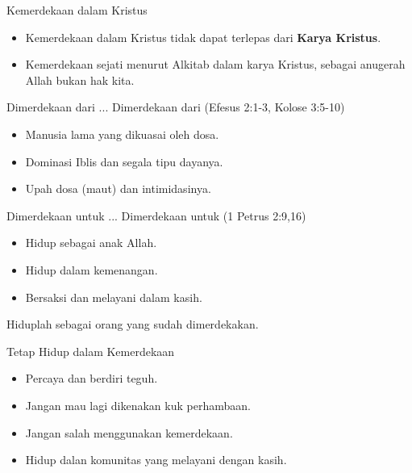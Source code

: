 \documentclass[10pt,svgnames]{beamer} %
\begin{document}
\begin{frame}{Kemerdekaan dalam Kristus}
	\begin{itemize}
		\item Kemerdekaan dalam Kristus tidak dapat terlepas dari \textbf{Karya Kristus}.
		\item Kemerdekaan sejati menurut Alkitab dalam karya Kristus, sebagai anugerah Allah bukan hak kita.
	\end{itemize}
\end{frame}

\begin{frame}{Dimerdekaan dari ...}
	Dimerdekaan dari (Efesus 2:1-3, Kolose 3:5-10)
	\begin{itemize}
		\item Manusia lama yang dikuasai oleh dosa.
		\item Dominasi Iblis dan segala tipu dayanya.
		\item Upah dosa (maut) dan intimidasinya.
	\end{itemize}
\end{frame}

\begin{frame}{Dimerdekaan untuk ...}
	Dimerdekaan untuk (1 Petrus 2:9,16)
	\begin{itemize}
		\item Hidup sebagai anak Allah.
		\item Hidup dalam kemenangan.
		\item Bersaksi dan melayani dalam kasih.
	\end{itemize}
	Hiduplah sebagai orang yang sudah dimerdekakan.
\end{frame}


\begin{frame}{Tetap Hidup dalam Kemerdekaan}
	\begin{itemize}
		\item Percaya dan berdiri teguh.
		\item Jangan mau lagi dikenakan kuk perhambaan.
		\item Jangan salah menggunakan kemerdekaan.
		\item Hidup dalan komunitas yang melayani dengan kasih.
	\end{itemize}
\end{frame}
\end{document}
